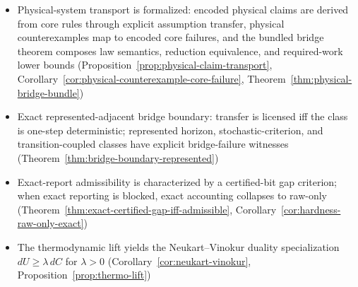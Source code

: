 \begin{itemize}
\item Physical-system transport is formalized: encoded physical claims are derived from core rules through explicit assumption transfer, physical counterexamples map to encoded core failures, and the bundled bridge theorem composes law semantics, reduction equivalence, and required-work lower bounds (Proposition~\ref{prop:physical-claim-transport}, Corollary~\ref{cor:physical-counterexample-core-failure}, Theorem~\ref{thm:physical-bridge-bundle})
\item Exact represented-adjacent bridge boundary: transfer is licensed iff the class is one-step deterministic; represented horizon, stochastic-criterion, and transition-coupled classes have explicit bridge-failure witnesses (Theorem~\ref{thm:bridge-boundary-represented})
\item Exact-report admissibility is characterized by a certified-bit gap criterion; when exact reporting is blocked, exact accounting collapses to raw-only (Theorem~\ref{thm:exact-certified-gap-iff-admissible}, Corollary~\ref{cor:hardness-raw-only-exact})
\item The thermodynamic lift yields the Neukart--Vinokur duality specialization $dU \ge \lambda\,dC$ for $\lambda>0$ (Corollary~\ref{cor:neukart-vinokur}, Proposition~\ref{prop:thermo-lift})
\end{itemize}

